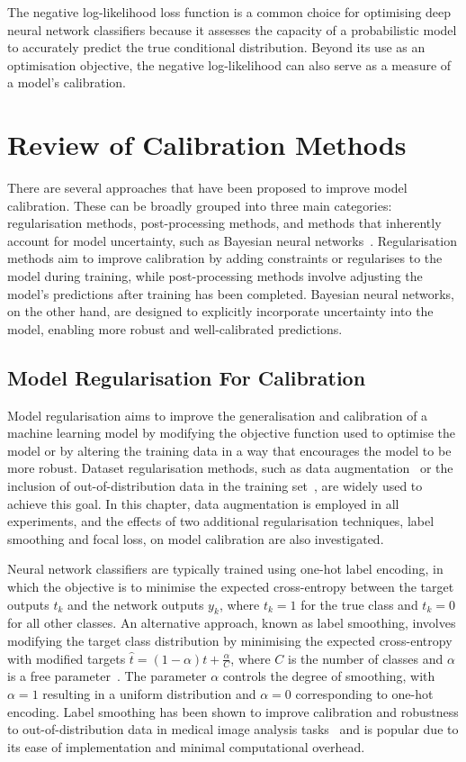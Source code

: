 The negative log-likelihood loss function is a common choice for optimising deep neural network classifiers because it assesses the capacity of a probabilistic model to accurately predict the true conditional distribution. Beyond its use as an optimisation objective, the negative log-likelihood can also serve as a measure of a model's calibration.



\section{Review of Calibration Methods}
\label{sec:calibration_review}
There are several approaches that have been proposed to improve model calibration. These can be broadly grouped into three main categories: regularisation methods, post-processing methods, and methods that inherently account for model uncertainty, such as Bayesian neural networks~\citep{gawlikowski2021survey}. Regularisation methods aim to improve calibration by adding constraints or regularises to the model during training, while post-processing methods involve adjusting the model's predictions after training has been completed. Bayesian neural networks, on the other hand, are designed to explicitly incorporate uncertainty into the model, enabling more robust and well-calibrated predictions.

\subsection{Model Regularisation For Calibration}
Model regularisation aims to improve the generalisation and calibration of a machine learning model by modifying the objective function used to optimise the model or by altering the training data in a way that encourages the model to be more robust. Dataset regularisation methods, such as data augmentation~\citep{hendrycks2019augmix} or the inclusion of out-of-distribution data in the training set~\citep{hendrycks2018deep}, are widely used to achieve this goal. In this chapter, data augmentation is employed in all experiments, and the effects of two additional regularisation techniques, label smoothing and focal loss, on model calibration are also investigated.

Neural network classifiers are typically trained using one-hot label encoding, in which the objective is to minimise the expected cross-entropy between the target outputs $t_k$ and the network outputs $y_k$, where $t_k=1$ for the true class and $t_k=0$ for all other classes. An alternative approach, known as label smoothing, involves modifying the target class distribution by minimising the expected cross-entropy with modified targets $\hat{t} = (1 - \alpha) t + \frac{\alpha}{C}$, where $C$ is the number of classes and $\alpha$ is a free parameter~\citep{szegedy2016rethinking}. The parameter $\alpha$ controls the degree of smoothing, with $\alpha = 1$ resulting in a uniform distribution and $\alpha = 0$ corresponding to one-hot encoding. Label smoothing has been shown to improve calibration and robustness to out-of-distribution data in medical image analysis tasks~\citep{islam2021spatially} and is popular due to its ease of implementation and minimal computational overhead.

